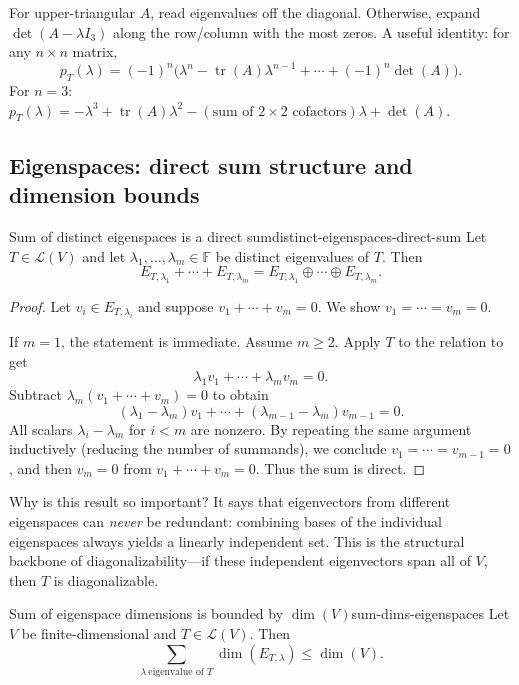 \begin{examtip}[title={Exam Focus: $3\times 3$ characteristic polynomial via cofactor expansion}]
For upper-triangular $A$, read eigenvalues off the diagonal.
Otherwise, expand $\det(A-\lambda I_3)$ along the row/column with the most zeros.
A useful identity: for any $n\times n$ matrix,
\[
p_T(\lambda) = (-1)^n\bigl(\lambda^n - \operatorname{tr}(A)\lambda^{n-1} + \cdots + (-1)^n\det(A)\bigr).
\]
For $n=3$: $p_T(\lambda) = -\lambda^3 + \operatorname{tr}(A)\lambda^2 - (\text{sum of }2\times 2\text{ cofactors})\lambda + \det(A)$.
\end{examtip}

\subsection{Eigenspaces: direct sum structure and dimension bounds}

\begin{theorem}{Sum of distinct eigenspaces is a direct sum}{distinct-eigenspaces-direct-sum}
Let $T\in\mathcal{L}(V)$ and let $\lambda_1,\dots,\lambda_m\in\mathbb{F}$ be distinct eigenvalues of $T$.
Then
\[
E_{T,\lambda_1}+\cdots+E_{T,\lambda_m}=E_{T,\lambda_1}\oplus\cdots\oplus E_{T,\lambda_m}.
\]
\end{theorem}

\begin{proof}
Let $v_i\in E_{T,\lambda_i}$ and suppose $v_1+\cdots+v_m=0$.
We show $v_1=\cdots=v_m=0$.

If $m=1$, the statement is immediate. Assume $m\ge 2$.
Apply $T$ to the relation to get
\[
\lambda_1 v_1+\cdots+\lambda_m v_m=0.
\]
Subtract $\lambda_m(v_1+\cdots+v_m)=0$ to obtain
\[
(\lambda_1-\lambda_m)v_1+\cdots+(\lambda_{m-1}-\lambda_m)v_{m-1}=0.
\]
All scalars $\lambda_i-\lambda_m$ for $i<m$ are nonzero. By repeating the same argument inductively (reducing the number of summands),
we conclude $v_1=\cdots=v_{m-1}=0$, and then $v_m=0$ from $v_1+\cdots+v_m=0$.
Thus the sum is direct.
\end{proof}

Why is this result so important?
It says that eigenvectors from different eigenspaces can \emph{never} be redundant: combining bases of the individual eigenspaces always yields a linearly independent set.
This is the structural backbone of diagonalizability---if these independent eigenvectors span all of $V$, then $T$ is diagonalizable.

\begin{theorem}{Sum of eigenspace dimensions is bounded by $\dim(V)$}{sum-dims-eigenspaces}
Let $V$ be finite-dimensional and $T\in\mathcal{L}(V)$. Then
\[
\sum_{\lambda\ \text{eigenvalue of }T}\dim(E_{T,\lambda})\le \dim(V).
\]
\end{theorem}


